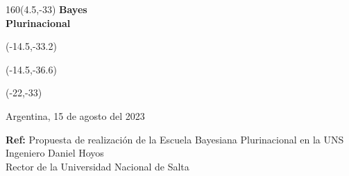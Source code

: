 \documentclass[a4paper,10pt]{letter}
\begin{document}
\begin{letter}

\begin{textblock}{160}(4.5,-33)
\noindent \Huge\textbf{Bayes \\ Plurinacional \\}
\end{textblock}
\begin{textblock}{80}(-14.5,-33.2)
\LARGE  {}
\end{textblock}
\begin{textblock}{80}(-14.5,-36.6)
\LARGE {\scalebox{5}{$p$}}
\end{textblock}
\begin{textblock}{80}(-22,-33)
\LARGE {\scalebox{2.505}{$($}}
\end{textblock}




\vspace{-3.5cm}

\begin{flushright}
Argentina, 15 de agosto del 2023  \\
\end{flushright}

\noindent

\hfill \textbf{Ref:} Propuesta de realización de la Escuela Bayesiana Plurinacional en la UNS \\


\noindent Ingeniero Daniel Hoyos \\
\noindent Rector de la Universidad Nacional de Salta\\ [0.3cm]


\end{letter}
\end{document}
